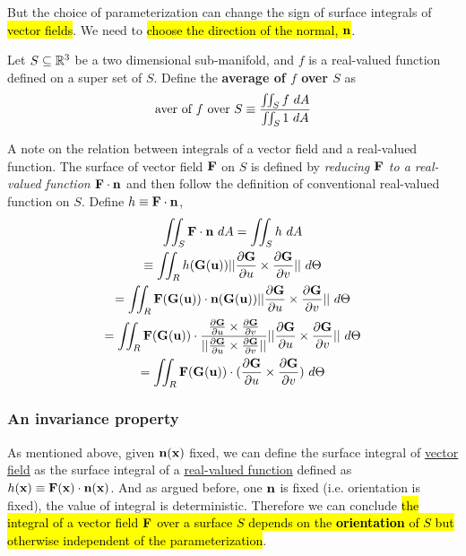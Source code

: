 \documentclass[11pt]{article}
\begin{document}
				\begin{remark}
					But the choice of parameterization can change the sign of surface integrals of \hl{vector fields}. We need to \hl{choose the direction of the normal, $\textbf{n}$}.
				\end{remark}
				
				\begin{definition}
					Let $S \subseteq \mathbb{R}^3$ be a two dimensional sub-manifold, and $f$ is a real-valued function defined on a super set of $S$. Define the \textbf{average of $f$ over $S$} as
					\begin{equation}
						\text{{aver of $f$ over $S$}} \equiv \frac{\iint_S f\ dA}{\iint_S1\ dA}
					\end{equation}
				\end{definition}
				
				\begin{remark}
					A note on the relation between integrals of a vector field and a real-valued function. The surface of vector field $\textbf{F}$ on $S$ is defined by \emph{reducing $\textbf{F}$ to a real-valued function $\textbf{F}\cdot \textbf{n}$} and then follow the definition of conventional real-valued function on $S$. Define $h \equiv \textbf{F} \cdot \textbf{n}$,
					\begin{gather}
						\iint_S \ve{F} \cdot \ve{n}\ dA = \iint_S h\ dA \\
						\equiv \iint_R h(\ve{G}(\ve{u})) \norm{\pd{\ve{G}}{u} \times \pd{\ve{G}}{v}}\ d\Theta \\
						= \iint_R \ve{F}(\ve{G}(\ve{u})) \cdot \ve{n}(\ve{G}(\ve{u})) \norm{\pd{\ve{G}}{u} \times \pd{\ve{G}}{v}}\ d\Theta \\
						= \iint_R \ve{F}(\ve{G}(\ve{u})) \cdot \frac{\pd{\ve{G}}{u} \times \pd{\ve{G}}{v}}{\norm{\pd{\ve{G}}{u} \times \pd{\ve{G}}{v}}} \norm{\pd{\ve{G}}{u} \times \pd{\ve{G}}{v}}\ d\Theta \\
						= \iint_R \ve{F}(\ve{G}(\ve{u})) \cdot (\pd{\ve{G}}{u} \times \pd{\ve{G}}{v})\ d\Theta
					\end{gather}
				\end{remark}
			\subsubsection{An invariance property}
				\begin{remark}
					As mentioned above, given $\textbf{n}(\textbf{x})$ fixed, we can define the surface integral of \ul{vector field} as the surface integral of a \ul{real-valued function} defined as $h(\textbf{x}) \equiv \textbf{F}(\textbf{x}) \cdot \textbf{n}(\textbf{x})$. And as argued before, one $\textbf{n}$ is fixed (i.e. orientation is fixed), the value of integral is deterministic. Therefore we can conclude \hl{the integral of a vector field $\textbf{F}$ over a surface $S$ depends on the \textbf{orientation} of $S$ but otherwise independent of the parameterization}.
				\end{remark}
				
\end{document}
